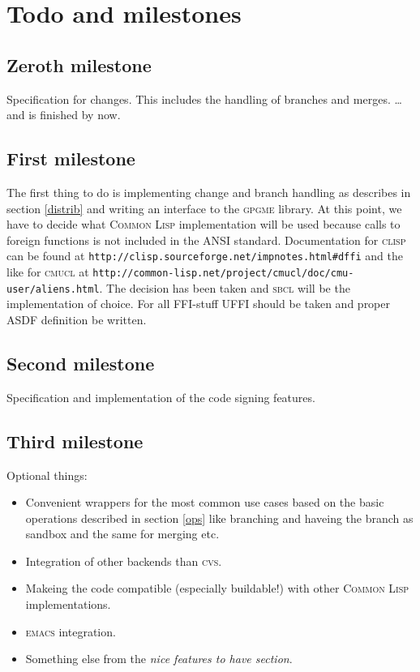 \documentclass[fleqn, 10pt, a4paper]{article}
\begin{document}
\section{Todo and milestones}

\subsection{Zeroth milestone}
Specification for changes. This includes
the handling of branches and merges.
\ldots and is finished by now.

\subsection{First milestone}
The first thing to do is implementing change and branch handling as describes
in section \ref{distrib} and writing an
interface to the \textsc{gpgme} library. At this point, we have to decide
what \textsc{Common Lisp} implementation will be used because calls
to foreign functions is not included in the ANSI standard.
Documentation for \textsc{clisp} can be found at
\texttt{http://clisp.sourceforge.net/impnotes.html\#dffi} and the like
for \textsc{cmucl} at \texttt{http://common-lisp.net/project/cmucl/doc/cmu-user/aliens.html}.
The decision has been taken and \textsc{sbcl} will be the implementation of
choice. For all FFI-stuff \textsc{UFFI} should be taken and proper
\textsc{ASDF} definition be written.

\subsection{Second milestone}
Specification and implementation of the code signing features.

\subsection{Third milestone}
Optional things:
\begin{itemize}
\item Convenient wrappers for the most common use cases based
on the basic operations described in section \ref{ops} like
branching and haveing the branch as sandbox and the same for merging
etc.
\item Integration of other backends than \textsc{cvs}.
\item Makeing the code compatible (especially buildable!) with
other \textsc{Common Lisp} implementations.
\item \textsc{emacs} integration.
\item Something else from the \emph{nice features to have section}.
\end{itemize}
\end{document}
